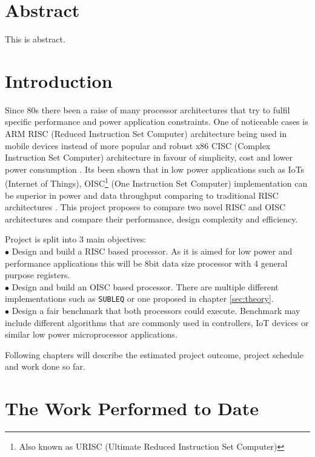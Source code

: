 \documentclass[a4paper,12pt]{article}
\begin{document}
\pagebreak

\begin{multicols}{2}

\section{Abstract}
This is abstract.

\section{Introduction}
Since 80s there been a raise of many processor architectures that try to fulfil specific performance and power application constraints. One of noticeable cases is ARM RISC (Reduced Instruction Set Computer) architecture being used in mobile devices instead of more popular and robust x86 CISC (Complex Instruction Set Computer) architecture in favour of simplicity, cost and lower power consumption \autocite{jamil_1995,blem_menon_sankaralingam_2013}. Its been shown that in low power applications such as IoTs (Internet of Things), OISC\footnote{Also known as URISC (Ultimate Reduced Instruction Set Computer)} (One Instruction Set Computer) implementation can be superior in power and data throughput comparing to traditional RISC architectures \autocite{yokota_saso_hara-azumi_2017, ahmed_sakamoto_anderson_hara-azumi_2015}. This project proposes to compare two novel RISC and OISC architectures and compare their performance, design complexity and efficiency.

Project is split into 3 main objectives:\\
$\bullet$ Design and build a RISC based processor. As it is aimed for low power and performance applications this will be 8bit data size processor with 4 general purpose registers.\\
$\bullet$ Design and build an OISC based processor. There are multiple different implementations such as \texttt{SUBLEQ} or one proposed in chapter \ref{sec:theory}.\\
$\bullet$ Design a fair benchmark that both processors could execute. Benchmark may include different algorithms that are commonly used in controllers, IoT devices or similar low power microprocessor applications.


Following chapters will describe the estimated project outcome, project schedule and work done so far.

\section{The Work Performed to Date}

\end{multicols}
\end{document}
